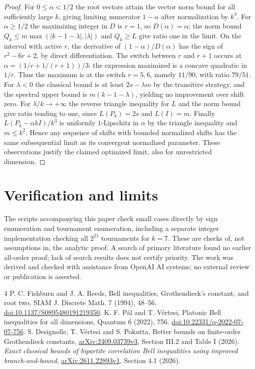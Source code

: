 \documentclass[11pt]{article}
\begin{document}
\begin{proof}
For $0\le\alpha<1/2$ the root vectors attain the vector norm bound for all sufficiently large $k$, giving limiting numerator $1-\alpha$ after normalization by $k^3$. For $\alpha\ge1/2$ the maximizing integer in $D$ is $r=1$, so $D(\alpha)=\alpha$; the norm bound $Q_k\le m\max(|k-1-\lambda|,|\lambda|)$ and $Q_k\ge L$ give ratio one in the limit. On the interval with active $r$, the derivative of $(1-\alpha)/D(\alpha)$ has the sign of $r^2-6r+2$, by direct differentiation. The switch between $r$ and $r+1$ occurs at $\alpha=(1/r+1/(r+1))/3$: the expression maximized is a concave quadratic in $1/r$. Thus the maximum is at the switch $r=5,6$, namely $11/90$, with ratio $79/51$. For $\lambda<0$ the classical bound is at least $2s-\lambda m$ by the transitive strategy, and the spectral upper bound is $m(k-1-\lambda)$, yielding no improvement over shift zero. For $\lambda/k\to+\infty$ the reverse triangle inequality for $L$ and the norm bound give ratio tending to one, since $L(P_k)=2s$ and $L(I)=m$. Finally $L(P_k-\alpha k I)/k^3$ is uniformly $1$-Lipschitz in $\alpha$ by the triangle inequality and $m\le k^2$. Hence any sequence of shifts with bounded normalized shifts has the same subsequential limit as its convergent normalized parameter. These observations justify the claimed optimized limit, also for unrestricted dimension.
\end{proof}

\section{Verification and limits}
The scripts accompanying this paper check small cases directly by sign enumeration and tournament enumeration, including a separate integer implementation checking all $2^{21}$ tournaments for $k=7$. These are checks of, not assumptions in, the analytic proof. A search of primary literature found no earlier all-order proof; lack of search results does not certify priority. The work was derived and checked with assistance from OpenAI AI systems; no external review or publication is asserted.
\begin{thebibliography}{4}
 P. C. Fishburn and J. A. Reeds, Bell inequalities, Grothendieck's constant, and root two, SIAM J. Discrete Math. 7 (1994), 48--56. \href{https://doi.org/10.1137/S0895480191219350}{doi:10.1137/S0895480191219350}.
 K. F. P\'al and T. V\'ertesi, Platonic Bell inequalities for all dimensions, Quantum 6 (2022), 756. \href{https://doi.org/10.22331/q-2022-07-07-756}{doi:10.22331/q-2022-07-07-756}.
 S. Designolle, T. V\'ertesi and S. Pokutta, Better bounds on finite-order Grothendieck constants, \href{https://arxiv.org/html/2409.03739v3}{arXiv:2409.03739v3}, Section III.2 and Table I (2026).
 \emph{Exact classical bounds of bipartite correlation Bell inequalities using improved branch-and-bound}, \href{https://arxiv.org/html/2611.22893v1}{arXiv:2611.22893v1}, Section 4.1 (2026).
\end{thebibliography}
\end{document}
